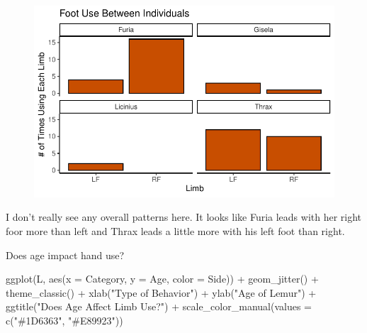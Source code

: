 \documentclass[
  letterpaper,
  DIV=11,
  numbers=noendperiod]{scrartcl}
\newenvironment{Shaded}{\begin{snugshade}}{\end{snugshade}}
\newcommand{\AttributeTok}[1]{\textcolor[rgb]{0.40,0.45,0.13}{#1}}
\newcommand{\FunctionTok}[1]{\textcolor[rgb]{0.28,0.35,0.67}{#1}}
\newcommand{\NormalTok}[1]{\textcolor[rgb]{0.00,0.23,0.31}{#1}}
\newcommand{\SpecialCharTok}[1]{\textcolor[rgb]{0.37,0.37,0.37}{#1}}
\newcommand{\StringTok}[1]{\textcolor[rgb]{0.13,0.47,0.30}{#1}}
\begin{document}
\begin{figure}[H]

{\centering \includegraphics{LeftyLemurs_files/figure-pdf/unnamed-chunk-44-1.pdf}

}

\end{figure}

I don't really see any overall patterns here. It looks like Furia leads
with her right foor more than left and Thrax leads a little more with
his left foot than right.

Does age impact hand use?

\begin{Shaded}
\begin{Highlighting}[]
\FunctionTok{ggplot}\NormalTok{(L, }\FunctionTok{aes}\NormalTok{(}\AttributeTok{x =}\NormalTok{ Category, }\AttributeTok{y =}\NormalTok{ Age, }\AttributeTok{color =}\NormalTok{ Side)) }\SpecialCharTok{+} 
  \FunctionTok{geom\_jitter}\NormalTok{()  }\SpecialCharTok{+}
  \FunctionTok{theme\_classic}\NormalTok{() }\SpecialCharTok{+}
  \FunctionTok{xlab}\NormalTok{(}\StringTok{"Type of Behavior"}\NormalTok{) }\SpecialCharTok{+}
  \FunctionTok{ylab}\NormalTok{(}\StringTok{"Age of Lemur"}\NormalTok{) }\SpecialCharTok{+}
  \FunctionTok{ggtitle}\NormalTok{(}\StringTok{"Does Age Affect Limb Use?"}\NormalTok{) }\SpecialCharTok{+} 
  \FunctionTok{scale\_color\_manual}\NormalTok{(}\AttributeTok{values =} \FunctionTok{c}\NormalTok{(}\StringTok{"\#1D6363"}\NormalTok{, }\StringTok{"\#E89923"}\NormalTok{))}
\end{Highlighting}
\end{Shaded}
\end{document}

